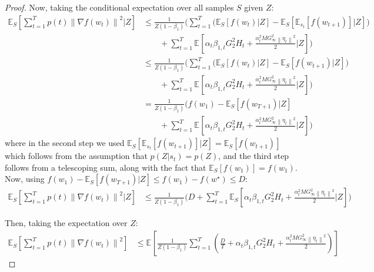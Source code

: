 \documentclass{article}
\newcommand{\norm}[1]{\left\lVert{#1}\right\rVert}
\newcommand{\currw}{w_t}
\newcommand{\nextw}{w_{t+1}}
\newcommand{\curre}{\eta_t}
\newcommand{\curra}{\alpha_t}
\newcommand{\normed}[1]{\left\lVert {#1} \right\rVert}
\newcommand{\bone}{\beta_1}
\newcommand{\bonet}{\beta_{1,t}}
\newcommand{\smooth}{M}
\newcommand{\highinft}{H_{t}}
\newcommand{\gradb}{G_\infty}
\newcommand{\gradbtwo}{G_2}
\newcommand{\expec}[2]{\mathbb E_{#1} \left[ {#2} \right]}
\begin{document}
\begin{proof}
Now, taking the conditional expectation over all samples $S$ given $Z$:
\begin{equation}
\begin{split}
   \expec{S}{\sum_{t=1}^T p(t) \normed{\nabla f(\currw)}^2 \Big| Z}
   &\leq \frac1{Z(1-\bone)} \Big( \sum_{t=1}^T \big( \expec{S}{f(\currw) | Z} - \expec{S}{ \expec{s_t}{f(\nextw)} | Z} \big) \\
   &\qquad + \sum_{t=1}^T \expec{}{\curra \bonet \gradbtwo^2 \highinft + \frac{\curra^2 \smooth \gradb^2 \norm{\curre}^2}2 \Big| Z} \Big) \\
   &\leq \frac1{Z(1-\bone)} \Big( \sum_{t=1}^T \big( \expec{S}{f(\currw) | Z} - \expec{S}{f(\nextw) | Z} \big) \\
   &\qquad + \sum_{t=1}^T \expec{}{\curra \bonet \gradbtwo^2 \highinft + \frac{\curra^2 \smooth \gradb^2 \norm{\curre}^2}2 \Big| Z} \Big) \\
   &= \frac1{Z(1-\bone)} \Big(f(w_1) - \expec{S}{f(w_{T+1}) | Z} \\
   &\qquad + \sum_{t=1}^T \expec{}{\curra \bonet \gradbtwo^2 \highinft + \frac{\curra^2 \smooth \gradb^2 \norm{\curre}^2}2 \Big| Z} \Big)
\end{split}
\end{equation}
where in the second step we used $\expec{S}{ \expec{s_t}{f(\nextw)} | Z} = \expec{S}{f(\nextw)}$ which follows from the assumption that $p(Z|s_t) = p(Z)$, and the third step follows from a telescoping sum, along with the fact that $\expec{S}{f(w_1)} = f(w_1)$.  Now, using
$f(w_1) - \expec{S}{f(w_{T+1}) | Z} \leq f(w_1) - f(w^\star) \leq D$:
\begin{equation}
\begin{split}
   \expec{S}{\sum_{t=1}^T p(t) \normed{\nabla f(\currw)}^2 \Big| Z}
   &\leq \frac1{Z(1-\bone)}
      \Big(D +
           \sum_{t=1}^T \expec{S}{\curra \bonet \gradbtwo^2 \highinft +
           \frac{\curra^2 \smooth \gradb^2 \norm{\curre}^2}2 \Big| Z}
      \Big)
\end{split}
\end{equation}

Then, taking the expectation over $Z$:
\begin{equation}
\begin{split}
   \expec{S}{\sum_{t=1}^T p(t) \normed{\nabla f(\currw)}^2}
   &\leq \expec{}{\frac1{Z(1-\bone)} \sum_{t=1}^T \left( \frac{D}{T} + \curra \bonet \gradbtwo^2 \highinft + \frac{\curra^2 \smooth \gradb^2 \norm{\curre}^2}2 \right) }
\end{split}
\end{equation}


\end{proof}
\end{document}
